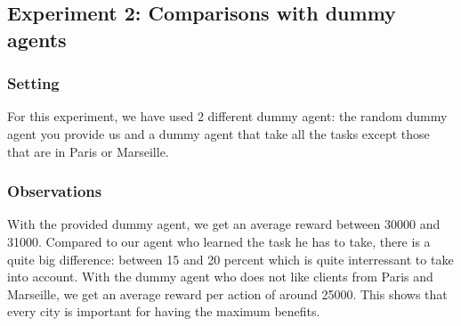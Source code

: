 \documentclass[11pt]{article}
\begin{document}
\subsection{Experiment 2: Comparisons with dummy agents}

\subsubsection{Setting}
For this experiment, we have used 2 different dummy agent: the random dummy agent you provide us and a dummy agent that take all the tasks except those that are in Paris or Marseille.

\subsubsection{Observations}
With the provided dummy agent, we get an average reward between 30000 and 31000. Compared to our agent who learned the task he has to take, there is a quite big difference: between 15 and 20 percent which is quite interressant to take into account.
With the dummy agent who does not like clients from Paris and Marseille, we get an average reward per action of around 25000. This shows that every city is important for having the maximum benefits.
\end{document}
